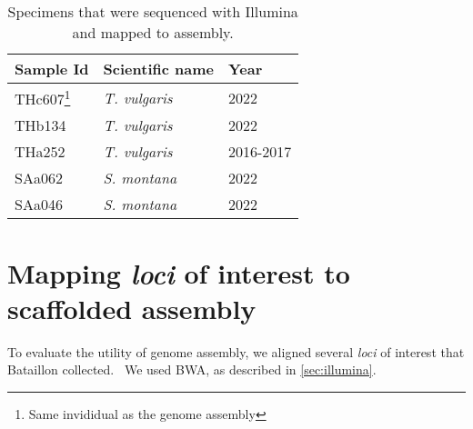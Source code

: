 \begin{table}[h]
    \begin{minipage}{\linewidth}
    \renewcommand\thefootnote{\thempfootnote}
    \centering
    \begin{tabular}{@{}lll@{}}
    \toprule
    Sample Id & Scientific name                      & Year      \\ \midrule
    THc607\footnote{Same invididual as the genome assembly}    & \textit{T. vulgaris}                          & 2022      \\
    THb134    & \textit{T. vulgaris}                 & 2022      \\
    THa252    & \textit{T. vulgaris}                 & 2016-2017 \\
    SAa062    & \textit{S. montana} & 2022      \\
    SAa046    & \textit{S. montana} & 2022      \\ \bottomrule
    \end{tabular}
    \caption{Specimens that were sequenced with Illumina and mapped to assembly. }
    \label{tab:illumina_samples}
    \end{minipage}
    \end{table}

\section{Mapping \textit{loci} of interest to scaffolded assembly}

To evaluate the utility of genome assembly, we aligned several \textit{loci} of interest that  Bataillon \etal collected.~\cite{bataillonGenotypePhenotypeGenetic2022} We used BWA, as described in \ref{sec:illumina}. 
